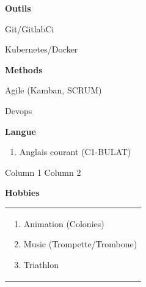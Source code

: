 \documentclass[a4paper,11pt,final]{memoir}
\newcommand{\SmallSep}{\vspace{0.2em}}
\newcommand{\CVSection}[1]
	{\Large\textbf{#1}\par
	\normalsize\normalfont}
\newcommand{\CVItem}[1]
	{\textbf{\color{RoyalBlue} #1}}
\begin{document}
\CVItem{Outils }
\begin{multicols}{2}
\begin{compactitem}[\color{RoyalBlue}$\circ$]
	\item Git/GitlabCi
	\item  Kubernetes/Docker
\end{compactitem}
\end{multicols}
\CVItem{Methods}
\begin{multicols}{2}
\begin{compactitem}[\color{RoyalBlue}$\circ$]
	\item Agile (Kamban, SCRUM)
	\item  Devops
\end{compactitem}
\end{multicols}


\noindent
 \begin{minipage}{0.60\textwidth}
\CVSection{Langue }
\begin{enumerate}[\color{RoyalBlue}$\circ$]
  \item Anglais courant (C1-BULAT)\\

\end{enumerate}
\end{minipage}%
\hfill

\begin{multicols}{2}
Column 1
\columnbreak
Column 2
\end{multicols}

\begin{minipage}{0.20\textwidth}
\SmallSep
\setlength{\parindent}{0pt}
\CVSection{Hobbies}
\begin{tabular}{|p{\textwidth}}
\begin{multicols}{1}
\begin{enumerate}[\color{RoyalBlue}$\circ$]
  \item Animation (Colonies)
  \item Music (Trompette/Trombone)   
\item Triathlon
\end{enumerate}
\end{multicols}
\end{tabular}
\end{minipage}%
\framebreak



\end{document}
